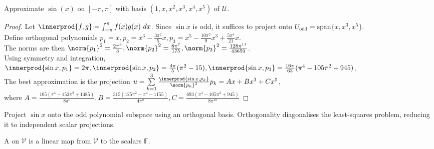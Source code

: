 \begin{example} Approximate $\sin(x)$ on $[-\pi, \pi]$ with basis $(1, x, x^2, x^3, x^4, x^5)$ of $\mathcal{U}$.
\begin{proof}
Let $\innerprod{f, g} = \int_{-\pi}^{\pi} f(x)g(x)\ dx$. Since $\sin x$ is odd, it suffices to project onto $U_{\text{odd}} = \text{span}\{x, x^3, x^5\}$.\\
Define orthogonal polynomials $p_1 = x, p_2 = x^3 - \frac{3\pi^2}{5}x, p_3 = x^5 - \frac{10\pi^2}{9}x^3 + \frac{5\pi^4}{21}x$.\\
The norms are then $\norm{p_1}^2 = \frac{2\pi^3}{3}, \norm{p_2}^2 = \frac{8\pi^7}{175}, \norm{p_3}^2 = \frac{128\pi^{11}}{43659}$.\\
Using symmetry and integration, $\innerprod{\sin x, p_1} = 2\pi, \innerprod{\sin x, p_2} = \frac{4\pi}{5}(\pi^2 - 15), \innerprod{\sin x, p_3} = \frac{16\pi}{63}(\pi^4 - 105\pi^2 + 945)$.\\
The best approximation is the projection $u = \sum\limits_{k=1}^3 \frac{\innerprod{\sin x,p_k}}{\norm{p_k}^2} p_k = A x + B x^3 + C x^5$, \\
where $A = \frac{105(\pi^4 - 153\pi^2 + 1485)}{8\pi^6}, B = \frac{315(125\pi^2 - \pi^4 - 1155)}{4\pi^8}, C = \frac{693(\pi^4 - 105\pi^2 + 945)}{8\pi^{10}}$
\end{proof}\end{example}

Project $\sin x$ onto the odd polynomial subspace using an orthogonal basis. Orthogonality diagonalises the least-squares problem, reducing it to independent scalar projections.

\begin{definition} A  on $\mathcal{V}$ is a linear map from $\mathcal{V}$ to the scalars $\mathbb{F}$.
\end{definition}

